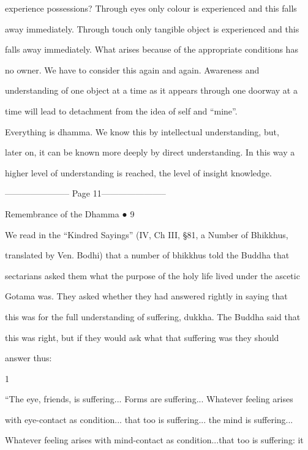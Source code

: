 experience possessions? Through eyes only colour is experienced and this falls  

away immediately. Through touch only tangible object is experienced and this  

falls away immediately. What arises because of the appropriate conditions has  

no   owner.   We   have   to   consider   this   again   and   again.   Awareness   and  

understanding of one object at a time as it appears through one doorway at a  

time will lead to detachment from the idea of self and “mine”. 

   Everything  is  dhamma.  We   know  this  by   intellectual  understanding,  but,  

later on, it can be known more deeply by direct understanding. In this way a  

higher level of understanding is reached, the level of insight knowledge. 


----------------------- Page 11-----------------------

                                                           Remembrance of the Dhamma ● 9 



We   read  in  the  “Kindred  Sayings”  (IV,  Ch  III,  §81,  a  Number  of  Bhikkhus,  

translated  by Ven.  Bodhi)  that  a  number  of  bhikkhus  told  the  Buddha  that  

sectarians asked them what the purpose of the holy life lived under the ascetic  

Gotama was.  They  asked whether  they  had  answered  rightly  in  saying  that  

this was for the full understanding of suffering, dukkha. The Buddha said that  

this  was  right,  but   if  they  would  ask  what   that  suffering  was   they  should  

answer thus: 



                                                 1 

      “The eye, friends, is suffering... Forms  are suffering... Whatever feeling arises  

      with eye-contact as condition... that too is suffering... the mind is suffering...  

      Whatever feeling arises with mind-contact as condition...that too is suffering: it  

